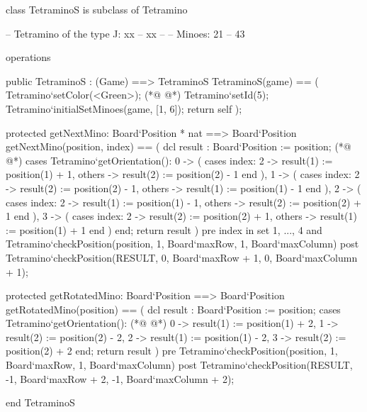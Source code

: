 \begin{vdmpp}[breaklines=true]
class TetraminoS is subclass of Tetramino
  
 -- Tetramino of the type J:  xx
 --        xx
 --
 -- Minoes:       21
 --        43
 
 
 operations
 
  public TetraminoS : (Game) ==> TetraminoS
  TetraminoS(game) == (
   Tetramino`setColor(<Green>);
(*@
\label{TetraminoS:15}
@*)
   Tetramino`setId(5);
   Tetramino`initialSetMinoes(game, [1, 6]);
   return self
  );
   
  protected getNextMino: Board`Position * nat ==> Board`Position
  getNextMino(position, index) == (
   dcl result : Board`Position := position;
(*@
\label{getNextMino:23}
@*)
   cases Tetramino`getOrientation():
    0 -> (
     cases index:
      2 -> result(1) := position(1) + 1,
      others -> result(2) := position(2) - 1
     end
    ),
    1 -> (
     cases index:
      2 -> result(2) := position(2) - 1,
      others -> result(1) := position(1) - 1
     end
    ),
    2 -> (
     cases index:
      2 -> result(1) := position(1) - 1,
      others -> result(2) := position(2) + 1
     end
    ),
    3 -> (
     cases index:
      2 -> result(2) := position(2) + 1,
      others -> result(1) := position(1) + 1
     end
    )
   end;
   return result
  )
  pre index in set {1, ..., 4} 
   and Tetramino`checkPosition(position, 1, Board`maxRow, 1, Board`maxColumn)
  post Tetramino`checkPosition(RESULT, 0, Board`maxRow + 1, 0, Board`maxColumn + 1);
   
  protected getRotatedMino: Board`Position ==> Board`Position
  getRotatedMino(position) == (
   dcl result : Board`Position := position;
   cases Tetramino`getOrientation():
(*@
\label{getRotatedMino:59}
@*)
    0 -> result(1) := position(1) + 2,
    1 -> result(2) := position(2) - 2,
    2 -> result(1) := position(1) - 2,
    3 -> result(2) := position(2) + 2
   end;
   return result
  )
  pre Tetramino`checkPosition(position, 1, Board`maxRow, 1, Board`maxColumn)
  post Tetramino`checkPosition(RESULT, -1, Board`maxRow + 2, -1, Board`maxColumn + 2);

end TetraminoS
\end{vdmpp}
